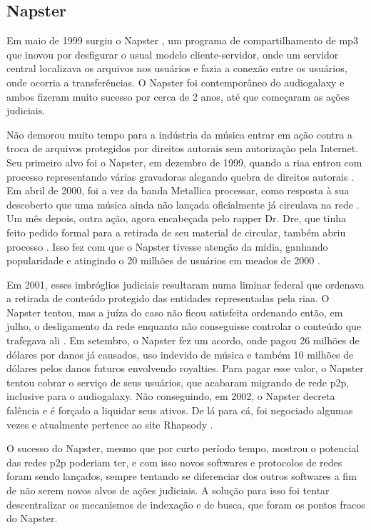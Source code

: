 \subsection{Napster}

Em maio de 1999 surgiu o Napster \cite{site:wiki-napster}, um programa de
compartilhamento de \gls*{mp3} que inovou por desfigurar o usual modelo
cliente-servidor, onde um servidor central localizava os arquivos nos usuários e fazia
a conexão entre os usuários, onde ocorria a transferências. O Napster foi contemporâneo
do \gls*{audiogalaxy} e ambos fizeram muito sucesso por cerca de 2 anos, até que
começaram as ações judiciais.

Não demorou muito tempo para a indústria da música entrar em ação contra a troca de
arquivos protegidos por direitos autorais sem autorização pela Internet. Seu primeiro
alvo foi o Napster, em dezembro de 1999, quando a \gls{riaa} entrou com processo
representando várias gravadoras alegando quebra de direitos autorais
\cite{site:napster-riaa}. Em abril de 2000, foi a vez da banda Metallica processar,
como resposta à sua descoberto que uma música ainda não lançada oficialmente já
circulava na rede \cite{site:napster-metallica,site:napster-metallica-orig}. Um mês
depois, outra ação, agora encabeçada pelo rapper Dr. Dre, que tinha feito pedido formal
para a retirada de seu material de circular, também abriu processo
\cite{site:napster-drdre-orig}. Isso fez com que o Napster tivesse atenção da mídia,
ganhando popularidade e atingindo o 20 milhões de usuários em meados de 2000
\cite{site:napster-use-2000}.

Em 2001, esses imbróglios judiciais resultaram numa liminar federal que ordenava a
retirada de conteúdo protegido das entidades representadas pela \gls*{riaa}. O Napster
tentou, mas a juíza do caso não ficou satisfeita ordenando então, em julho, o
desligamento da rede enquanto não conseguisse controlar o conteúdo que trafegava ali
\cite{site:wiki-napster}. Em setembro, o Napster fez um acordo, onde pagou 26 milhões de
dólares por danos já causados, uso indevido de música e também 10 milhões de dólares
pelos danos futuros envolvendo royalties. Para pagar esse valor, o Napster tentou cobrar
o serviço de seus usuários, que acabaram migrando de rede \gls*{p2p}, inclusive para o
\gls*{audiogalaxy}. Não conseguindo, em 2002, o Napster decreta falência e é forçado a
liquidar seus ativos. De lá para cá, foi negociado algumas vezes e atualmente pertence
ao site Rhapsody \cite{site:napster-rhapsody}.

O sucesso do Napster, mesmo que por curto período tempo, mostrou o potencial das redes
\gls*{p2p} poderiam ter, e com isso novos softwares e protocolos de redes foram sendo
lançados, sempre tentando se diferenciar dos outros softwares a fim de não serem novos
alvos de ações judiciais. A solução para isso foi tentar descentralizar os mecanismos de
indexação e de busca, que foram os pontos fracos do Napster.

